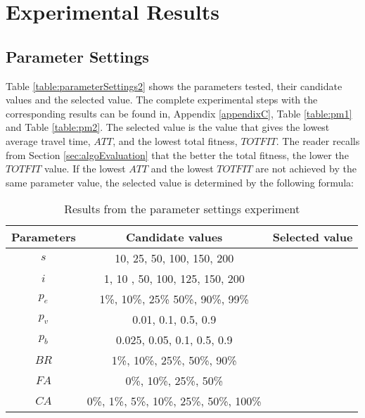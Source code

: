 \section{Experimental Results}


\subsection{Parameter Settings}
\label{subsec:parameterSettings_results}
Table \vref{table:parameterSettings2} shows the parameters tested, their candidate values and the selected value. The complete experimental steps with the corresponding results can be found in, Appendix \ref{appendixC}, Table \vref{table:pm1} and Table \vref{table:pm2}. The selected value is the value that gives the lowest average travel time, $ATT$, and the lowest total fitness, $TOTFIT$. The reader recalls from Section \vref{sec:algoEvaluation} that the better the total fitness, the lower the $TOTFIT$ value. If the lowest $ATT$ and the lowest $TOTFIT$ are not achieved by the same parameter value, the selected value is determined by the following formula:
\newline



\newline
	\begin{table}[H]
	\centering
    \begin{tabular}{|c|c||c|}
 	\hline
 	Parameters & Candidate values & Selected value\\
 	\hline
    $s$ & 10, 25, 50, 100, 150, 200 & ~ \\
    $i$ & 1, 10 , 50, 100, 125, 150, 200 & ~ \\
    $p_{e}$ & 1\%, 10\%, 25\% 50\%, 90\%, 99\% & ~ \\
    $p_{v}$ & 0.01, 0.1, 0.5, 0.9 & ~  \\
    $p_{b}$ & 0.025, 0.05, 0.1, 0.5, 0.9 & ~ \\
    $BR$ & 1\%, 10\%, 25\%, 50\%, 90\% & ~ \\
    $FA$ & 0\%, 10\%, 25\%, 50\%  & ~ \\
    $CA$ & 0\%, 1\%, 5\%, 10\%, 25\%, 50\%, 100\% & ~ \\
	\hline
    \end{tabular}
    \caption {Results from the parameter settings experiment}
    \label{table:parameterSettings2}
	\end{table}

